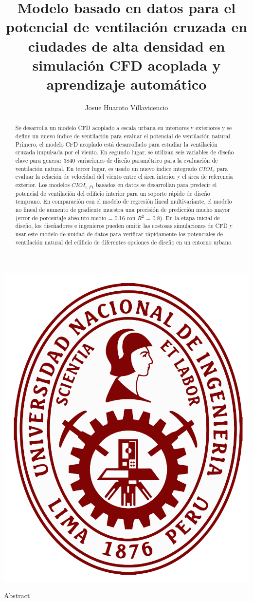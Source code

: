 \documentclass[10pt]{beamer}
\author{Josue Huaroto Villavicencio}
\title{Modelo basado en datos para el potencial de ventilación cruzada en ciudades de alta densidad
en simulación CFD acoplada y aprendizaje automático}
\institute[UNI]{Universidad Nacional de Ingeniería}
\begin{document}
\begin{frame}
\includegraphics[scale=0.05]{./Images/logoUNI.png}
\titlepage
\end{frame}
\begin{frame}{Abstract}
\begin{abstract}
Se desarrolla un modelo CFD acoplado a escala urbana en interiores y exteriores y se define un nuevo índice de ventilación para evaluar el potencial de ventilación natural. Primero, el modelo CFD acoplado está desarrollado para estudiar la ventilación cruzada impulsada por el viento. En segundo lugar, se utilizan seis variables de diseño clave para generar 3840 variaciones de diseño paramétrico para la evaluación de ventilación natural. En tercer lugar, es usado un nuevo índice integrado $CIOI_{v}$ para evaluar la relación de velocidad del viento entre el área interior y el área de referencia exterior. Los modelos $CIOI_{v,F1}$ basados en datos se desarrollan para predecir el potencial de ventilación del edificio interior para un soporte rápido de diseño temprano. En comparación con el modelo de regresión lineal multivariante, el modelo no lineal de aumento de gradiente muestra una precisión de predicción mucho mayor (error de porcentaje absoluto medio = 0.16 con $R^{2}$ = 0.8). En la etapa inicial de diseño, los diseñadores e ingenieros pueden omitir las costosas simulaciones de CFD y usar este modelo de unidad de datos para verificar rápidamente los potenciales de ventilación natural del edificio de diferentes opciones de diseño en un entorno urbano.
\end{abstract}
\end{frame}
\end{document}
